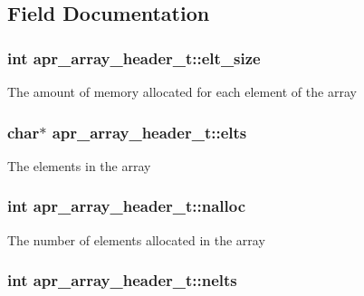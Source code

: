 \subsection{Field Documentation}
\hypertarget{structapr__array__header__t_a36a690ebc781edc9e99ac1bec53c1770}{
\subsubsection[{elt\-\_\-size}]{\setlength{\rightskip}{0pt plus 5cm}int apr\-\_\-array\-\_\-header\-\_\-t\-::elt\-\_\-size}}\label{structapr__array__header__t_a36a690ebc781edc9e99ac1bec53c1770}
The amount of memory allocated for each element of the array \hypertarget{structapr__array__header__t_af8462fa2a1ddf6406c66cd3dd441a269}{
\subsubsection[{elts}]{\setlength{\rightskip}{0pt plus 5cm}char$\ast$ apr\-\_\-array\-\_\-header\-\_\-t\-::elts}}\label{structapr__array__header__t_af8462fa2a1ddf6406c66cd3dd441a269}
The elements in the array \hypertarget{structapr__array__header__t_a0ceb78a23ebef1bceea5f0cd3e1513b6}{
\subsubsection[{nalloc}]{\setlength{\rightskip}{0pt plus 5cm}int apr\-\_\-array\-\_\-header\-\_\-t\-::nalloc}}\label{structapr__array__header__t_a0ceb78a23ebef1bceea5f0cd3e1513b6}
The number of elements allocated in the array \hypertarget{structapr__array__header__t_ab11b88220885c5a0920a06ac85680055}{
\subsubsection[{nelts}]{\setlength{\rightskip}{0pt plus 5cm}int apr\-\_\-array\-\_\-header\-\_\-t\-::nelts}}\label{structapr__array__header__t_ab11b88220885c5a0920a06ac85680055}
